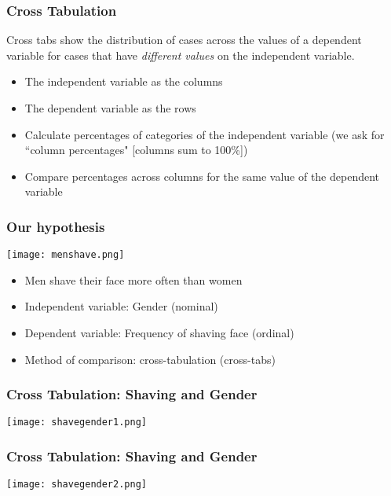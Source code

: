 \documentclass{beamer}
\begin{document}
\begin{frame}
 \frametitle<+->{Cross Tabulation}
 \begin{minipage}{.48\linewidth}
 Cross tabs show the distribution of cases \alert{across the values of a dependent variable} for cases that have \textit{different values} on the \alert{independent variable}.
 \end{minipage}\hfill
 \begin{minipage}{.48\linewidth}
 \begin{itemize}[<+->]
   \item The independent variable as the columns
   \item The dependent variable as the rows
   \item Calculate percentages of categories of the independent variable (we ask for ``column percentages" [columns sum to 100\%])
   \item Compare percentages across columns for the same value of the dependent variable
 \end{itemize}
 \end{minipage}
\end{frame}

\begin{frame}
 \frametitle{Our hypothesis}
 \begin{minipage}{.48\linewidth}
 \texttt{[image: menshave.png]}
 \end{minipage}\hfill
 \begin{minipage}{.48\linewidth}
 \begin{itemize}
   \item Men shave their face more often than women
   \item Independent variable: Gender (nominal)
   \item Dependent variable: Frequency of shaving face (ordinal)
   \item Method of comparison: cross-tabulation (cross-tabs)
 \end{itemize}
 \end{minipage}
\end{frame}

\begin{frame}
 \frametitle<+->{Cross Tabulation: Shaving and Gender}
 \texttt{[image: shavegender1.png]}
\end{frame}

\begin{frame}
 \frametitle<+->{Cross Tabulation: Shaving and Gender}
 \texttt{[image: shavegender2.png]}
\end{frame}
\end{document}
